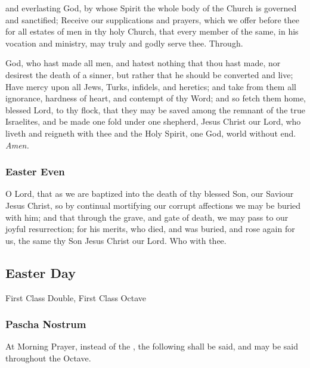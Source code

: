      and everlasting God, by whose Spirit the whole body of the Church is governed and sanctified; Receive our supplications and prayers, which we offer before thee for all estates of men in thy holy Church, that every member of the same, in his vocation and ministry, may truly and godly serve thee. Through.
	
     God, who hast made all men, and hatest nothing that thou hast made, nor desirest the death of a sinner, but rather that he should be converted and live; Have mercy upon all Jews, Turks, infidels, and heretics; and take from them all ignorance, hardness of heart, and contempt of thy Word; and so fetch them home, blessed Lord, to thy flock, that they may be saved among the remnant of the true Israelites, and be made one fold under one shepherd, Jesus Christ our Lord, who liveth and reigneth with thee and the Holy Spirit, one God, world without end. \textit{Amen.}
    	
    \subsubsection{Easter Even}
    
     O Lord, that as we are baptized into the death of thy blessed Son, our Saviour Jesus Christ, so by continual mortifying our corrupt affections we may be buried with him; and that through the grave, and gate of death, we may pass to our joyful resurrection; for his merits, who died, and was buried, and rose again for us, the same thy Son Jesus Christ our Lord. Who with thee.

\subsection{Easter Day}
\begin{inhead}
    {First Class Double, First Class Octave}
\end{inhead}

\subsubsection{Pascha Nostrum}\label{pascha}
\begin{rubric}
    At Morning Prayer, instead of the , the following shall be said, and may be said throughout the Octave.
\end{rubric}

